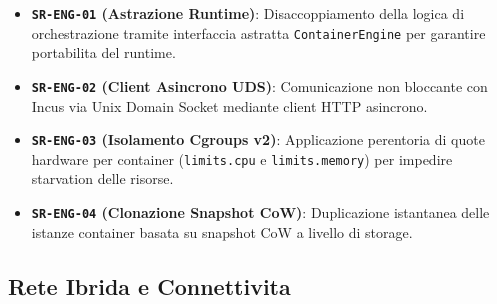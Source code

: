 \begin{itemize}
\tightlist
\item
  \textbf{\passthrough{\lstinline!SR-ENG-01!} (Astrazione Runtime)}:
  Disaccoppiamento della logica di orchestrazione tramite interfaccia
  astratta \passthrough{\lstinline!ContainerEngine!} per garantire
  portabilita del runtime.
\item
  \textbf{\passthrough{\lstinline!SR-ENG-02!} (Client Asincrono UDS)}:
  Comunicazione non bloccante con Incus via Unix Domain Socket mediante
  client HTTP asincrono.
\item
  \textbf{\passthrough{\lstinline!SR-ENG-03!} (Isolamento Cgroups v2)}:
  Applicazione perentoria di quote hardware per container
  (\passthrough{\lstinline!limits.cpu!} e
  \passthrough{\lstinline!limits.memory!}) per impedire starvation delle
  risorse.
\item
  \textbf{\passthrough{\lstinline!SR-ENG-04!} (Clonazione Snapshot
  CoW)}: Duplicazione istantanea delle istanze container basata su
  snapshot CoW a livello di storage.
\end{itemize}

\subsection{Rete Ibrida e
Connettivita}\label{rete-ibrida-e-connettivita}

